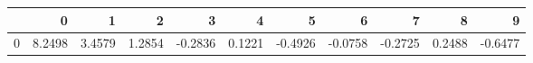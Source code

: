 \begin{tabular}{lrrrrrrrrrr}
\toprule
{} &       0 &       1 &       2 &       3 &       4 &       5 &       6 &       7 &       8 &       9 \\
\midrule
0 &  8.2498 &  3.4579 &  1.2854 & -0.2836 &  0.1221 & -0.4926 & -0.0758 & -0.2725 &  0.2488 & -0.6477 \\
\bottomrule
\end{tabular}
